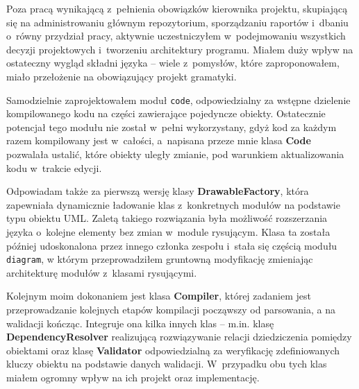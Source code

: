 Poza pracą wynikającą z~pełnienia obowiązków kierownika projektu, skupiającą się na administrowaniu głównym repozytorium, sporządzaniu raportów i~dbaniu o~równy przydział pracy, aktywnie uczestniczyłem w~podejmowaniu wszystkich decyzji projektowych i~tworzeniu architektury programu. Miałem duży wpływ na ostateczny wygląd składni języka -- wiele z~pomysłów, które zaproponowałem, miało przełożenie na obowiązujący projekt gramatyki.

Samodzielnie zaprojektowałem moduł \texttt{code}, odpowiedzialny za wstępne dzielenie kompilowanego kodu na części zawierające pojedyncze obiekty. Ostatecznie potencjał tego modułu nie został w~pełni wykorzystany, gdyż kod za każdym razem kompilowany jest w~całości, a~napisana przeze mnie klasa \textbf{Code} pozwalała ustalić, które obiekty uległy zmianie, pod warunkiem aktualizowania kodu w~trakcie edycji.

Odpowiadam także za pierwszą wersję klasy \textbf{DrawableFactory}, która zapewniała dynamicznie ładowanie klas z~konkretnych modułów na podstawie typu obiektu UML. Zaletą takiego rozwiązania była możliwość rozszerzania języka o~kolejne elementy bez zmian w~module rysującym. Klasa ta została później udoskonalona przez innego członka zespołu i~stała się częścią modułu \texttt{diagram}, w którym przeprowadziłem gruntowną modyfikację zmieniając architekturę modułów z~klasami rysującymi.

Kolejnym moim dokonaniem jest klasa \textbf{Compiler}, której zadaniem jest przeprowadzanie kolejnych etapów kompilacji począwszy od parsowania, a na walidacji kończąc. Integruje ona kilka innych klas -- m.in. klasę \textbf{DependencyResolver} realizującą rozwiązywanie relacji dziedziczenia pomiędzy obiektami oraz klasę \textbf{Validator} odpowiedzialną za weryfikację zdefiniowanych kluczy obiektu na podstawie danych walidacji. W~przypadku obu tych klas miałem ogromny wpływ na ich projekt oraz implementację.
